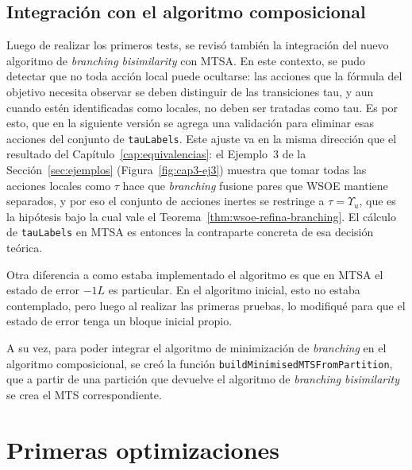 \subsection{Integración con el algoritmo composicional}
Luego de realizar los primeros tests, se revisó también la integración del nuevo algoritmo de \textit{branching bisimilarity} con MTSA. En este contexto, se pudo detectar que no toda acción local puede ocultarse: las acciones que la fórmula del objetivo necesita observar se deben distinguir de las transiciones tau, y aun cuando estén identificadas como locales, no deben ser tratadas como tau. Es por esto, que en la siguiente versión se agrega una validación para eliminar esas acciones del conjunto de \texttt{tauLabels}. Este ajuste va en la misma dirección que el resultado del Capítulo~\ref{cap:equivalencias}: el Ejemplo~3 de la Sección~\ref{sec:ejemplos} (Figura~\ref{fig:cap3-ej3}) muestra que tomar todas las acciones locales como $\tau$ hace que \textit{branching} fusione pares que WSOE mantiene separados, y por eso el conjunto de acciones inertes se restringe a $\tau = \Upsilon_u$, que es la hipótesis bajo la cual vale el Teorema~\ref{thm:wsoe-refina-branching}. El cálculo de \texttt{tauLabels} en MTSA es entonces la contraparte concreta de esa decisión teórica.

Otra diferencia a como estaba implementado el algoritmo es que en MTSA el estado de error $-1L$ es particular. En el algoritmo inicial, esto no estaba contemplado, pero luego al realizar las primeras pruebas, lo modifiqué para que el estado de error tenga un bloque inicial propio.

A su vez, para poder integrar el algoritmo de minimización de \textit{branching} en el algoritmo composicional, se creó la función \texttt{buildMinimisedMTSFromPartition}, que a partir de una partición que devuelve el algoritmo de \textit{branching bisimilarity} se crea el MTS correspondiente. 

\section{Primeras optimizaciones}
\label{sec:v2}

